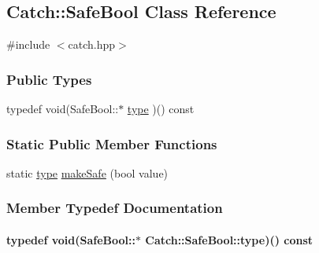 \hypertarget{classCatch_1_1SafeBool}{\subsection{Catch\-:\-:Safe\-Bool Class Reference}
\label{classCatch_1_1SafeBool}
}


{\ttfamily \#include $<$catch.\-hpp$>$}

\subsubsection*{Public Types}
\begin{DoxyCompactItemize}
\item 
typedef void(Safe\-Bool\-::$\ast$ \hyperlink{classCatch_1_1SafeBool_a14cd49eced5b255a1f59512d3b9395ae}{type} )() const 
\end{DoxyCompactItemize}
\subsubsection*{Static Public Member Functions}
\begin{DoxyCompactItemize}
\item 
static \hyperlink{classCatch_1_1SafeBool_a14cd49eced5b255a1f59512d3b9395ae}{type} \hyperlink{classCatch_1_1SafeBool_af0ea63d9820f8bf7a8b76377913c4e77}{make\-Safe} (bool value)
\end{DoxyCompactItemize}


\subsubsection{Member Typedef Documentation}
\hypertarget{classCatch_1_1SafeBool_a14cd49eced5b255a1f59512d3b9395ae}{
\paragraph[{type}]{\setlength{\rightskip}{0pt plus 5cm}typedef void(Safe\-Bool\-::$\ast$ Catch\-::\-Safe\-Bool\-::type)() const }}\label{classCatch_1_1SafeBool_a14cd49eced5b255a1f59512d3b9395ae}


